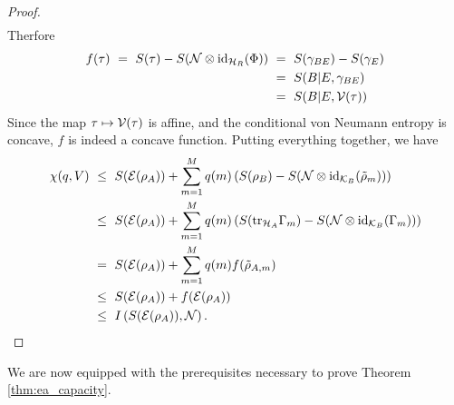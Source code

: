 \begin{proof}
\begin{align*}
   \end{align*}
   Therfore 
   \begin{align*}
       f(\tau) \ = \ S(\tau) - S(\cN \otimes \id_{\cH_R}(\Phi)) \ 
       &= \ S(\gamma_{BE}) - S(\gamma_E) \\
       &= \ S(B|E,\gamma_{BE}) \\
       &= \ S(B|E, \cV(\tau))
   \end{align*}
	Since the map $\tau \mapsto {\mathcal V}(\tau)$ is affine, and the conditional von Neumann entropy is concave, $f$ is indeed a concave function.
    Putting everything together, we have 
  \begin{align*}
  \chi(q,V) \
  &\leq \ S({\mathcal E}(\rho_A)) +  \sum_{m=1}^M q(m) \left( S(\rho_B) - S({\mathcal N} \otimes \mathrm{id}_{{\mathcal K}_B}(\tilde{\rho}_m))\right) \\
  &\leq \ S({\mathcal E}(\rho_A)) +  \sum_{m=1}^M q(m) \left( S(\mathrm{tr}_{{\mathcal H}_A} \Gamma_m) - S({\mathcal N} \otimes \mathrm{id}_{{\mathcal K}_B}(\Gamma_m))\right) \\
  &=  \ S({\mathcal E}(\rho_A)) + \sum_{m=1}^M q(m) f(\tilde{\rho}_{A,m}) \\
  &\leq \ S({\mathcal E}(\rho_A)) + f({\mathcal E}(\rho_A)) \\
  &\leq \ I\left(S({\mathcal E}(\rho_A)), {\mathcal N} \right).
  \end{align*}
\end{proof}
We are now equipped with the prerequisites necessary to prove Theorem \ref{thm:ea_capacity}.
